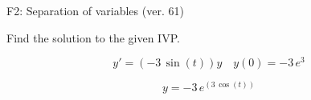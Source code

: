 \begin{exercise}
  \begin{exerciseTitle}F2: Separation of variables (ver. 61)\end{exerciseTitle}
  \begin{exerciseStatement}
    
Find the solution to the given IVP.

    
\[y'=( -3 \, \sin\left(t\right) )y\hspace{1em} y(0)= -3 \, e^{3}\]

  \end{exerciseStatement}
  \begin{exerciseAnswer}
    
\[y= -3 \, e^{\left(3 \, \cos\left(t\right)\right)}\]

  \end{exerciseAnswer}
\end{exercise}
